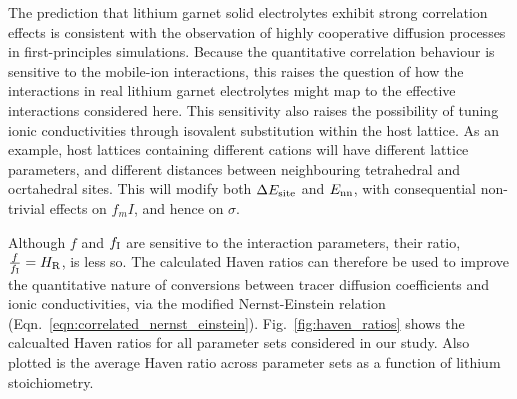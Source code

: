 \documentclass[aps,prb,twocolumn,superscriptaddress,reprint]{revtex4-1}
\begin{document}
The prediction that lithium garnet solid electrolytes exhibit strong correlation effects is consistent with the observation of highly cooperative diffusion processes in first-principles simulations.\cite{JalemEtAl_ChemMater2013, MeierEtAl_JPhysChemC2014} Because the quantitative correlation behaviour is sensitive to the mobile-ion interactions, this raises the question of how the interactions in real lithium garnet electrolytes might map to the effective interactions considered here. This sensitivity also raises the possibility of tuning ionic conductivities through isovalent substitution within the host lattice. As an example, host lattices containing different  cations will have different lattice parameters, and different distances between neighbouring tetrahedral and ocrtahedral sites. This will modify both $\Delta E_{\mathrm{site}}$ and $E_{\mathrm{nn}}$, with consequential non-trivial effects on $f_m{I}$, and hence on $\sigma$. 

Although $f$ and $f_{\mathrm{I}}$ are sensitive to the interaction parameters, their ratio, $\frac{f}{f_{\mathrm{I}}}=H_{\mathrm{R}}$, is less so. The calculated Haven ratios can therefore be used to improve the quantitative nature of conversions between tracer diffusion coefficients and ionic conductivities, via the modified Nernst-Einstein relation (Eqn.~\ref{eqn:correlated_nernst_einstein}). Fig.~\ref{fig:haven_ratios} shows the calcualted Haven ratios for all parameter sets considered in our study. Also plotted is the average Haven ratio across parameter sets as a function of lithium stoichiometry.
\end{document}
